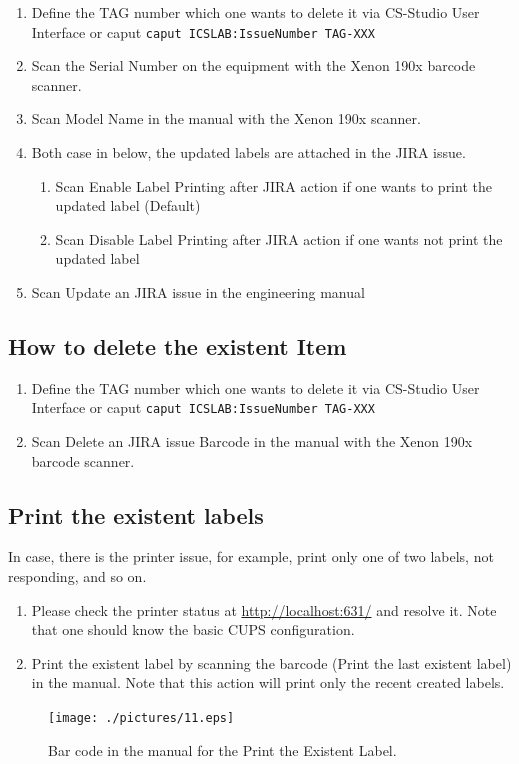 \documentclass[11pt
  , a4paper
  , article
  , oneside
  , showtrims
]{memoir}
\begin{document}
\begin{enumerate}
\item Define the TAG number which one wants to delete it via CS-Studio User Interface or caput \newline
  \texttt{caput ICSLAB:IssueNumber TAG-XXX}
\item Scan the Serial Number on the equipment  with the Xenon 190x barcode scanner.
\item Scan Model Name in the manual with the Xenon 190x scanner.
\item Both case in below, the updated labels are attached in the JIRA issue.
  \begin{enumerate}
  \item Scan Enable Label Printing after JIRA action if one wants to print the updated label (Default)
  \item Scan Disable Label Printing after JIRA action if one wants not print the updated label
  \end{enumerate}
\item Scan Update an JIRA issue in the engineering manual
\end{enumerate}


\subsection{How to delete the existent Item}

\begin{enumerate}
\item  Define the TAG number which one wants to delete it via  CS-Studio User Interface or caput \newline
\texttt{caput ICSLAB:IssueNumber TAG-XXX}
\item Scan Delete an JIRA issue Barcode in the manual with the Xenon 190x barcode scanner.
\end{enumerate}


\subsection{Print the existent labels}
In case, there is the printer issue, for example, print only one of two labels, not responding, and so on.
\begin{enumerate}
\item Please check the printer status at \url{http://localhost:631/} and resolve it. Note that one should know the basic CUPS configuration. 
\item Print the existent label by scanning the barcode (Print the last existent label) in the manual. Note that this action will print only the recent created labels. 
\end{enumerate}
\begin{figure}[!htb]
    \centering
    \texttt{[image: ./pictures/11.eps]}
    \caption{
    Bar code in the manual for the Print the Existent Label.
  }
\end{figure}
\end{document}
